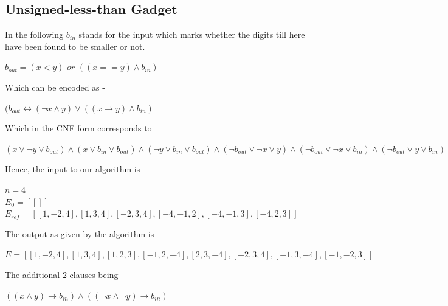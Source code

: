 \documentclass{article}
\theoremstyle{plain}
\begin{document}
\subsection{Unsigned-less-than Gadget}
In the following $b_{in}$ stands for the input which marks whether the digits till here have been found to be smaller or not.
\begin{center}
$b_{out} = (x < y)$ $or$ $((x == y) \wedge b_{in})$   
\end{center}
Which can be encoded as -
\begin{center}
$ (b_{out} \longleftrightarrow (\neg x \wedge y) \vee ((x \longrightarrow y) \wedge b_{in})$  
\end{center}
Which in the CNF form corresponds to
\begin{center}
$(x \vee \neg y \vee b_{out}) \wedge (x \vee b_{in} \vee b_{out}) \wedge (\neg y \vee b_{in} \vee b_{out}) \wedge (\neg b_{out} \vee \neg x \vee y) \wedge (\neg b_{out} \vee \neg x \vee b_{in}) \wedge (\neg b_{out} \vee y \vee b_{in})$
\end{center}
Hence, the input to our algorithm is
\begin{center}
$n = 4$\\
$E_0 = [[]]$ \\
$E_{ref} = [[1,-2,4],[1,3,4],[-2,3,4],[-4,-1,2],[-4,-1,3],[-4,2,3]]$
\end{center}
The output as given by the algorithm is 
\begin{center}
$E = [[1,-2,4],[1,3,4],[1,2,3],[-1,2,-4],[2,3,-4],[-2,3,4],[-1,3,-4],[-1,-2,3]]$
\end{center}
The additional $2$ clauses being 
\begin{center}
$((x \wedge y) \longrightarrow b_{in}) \wedge ((\neg x \wedge \neg y) \longrightarrow b_{in})$
\end{center}
\end{document}
